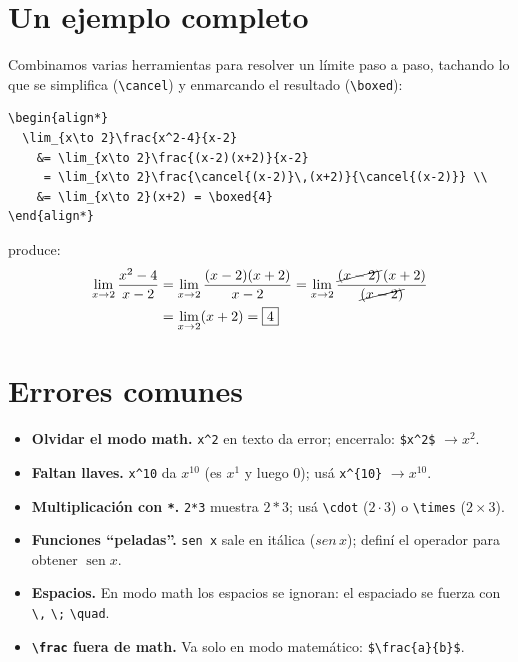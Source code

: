\documentclass[11pt,a4paper]{article}
\newcommand{\C}[1]{\texttt{\textbackslash #1}}   %
\DeclareMathOperator{\sen}{sen}
\theoremstyle{plain}      %
\theoremstyle{definition} %
\theoremstyle{remark}
\begin{document}
\section{Un ejemplo completo}
Combinamos varias herramientas para resolver un límite paso a paso, tachando lo
que se simplifica (\C{cancel}) y enmarcando el resultado (\C{boxed}):
\begin{lstlisting}
\begin{align*}
  \lim_{x\to 2}\frac{x^2-4}{x-2}
    &= \lim_{x\to 2}\frac{(x-2)(x+2)}{x-2}
     = \lim_{x\to 2}\frac{\cancel{(x-2)}\,(x+2)}{\cancel{(x-2)}} \\
    &= \lim_{x\to 2}(x+2) = \boxed{4}
\end{align*}
\end{lstlisting}
produce:
\begin{align*}
  \lim_{x\to 2}\frac{x^2-4}{x-2}
    &= \lim_{x\to 2}\frac{(x-2)(x+2)}{x-2}
     = \lim_{x\to 2}\frac{\cancel{(x-2)}\,(x+2)}{\cancel{(x-2)}} \\
    &= \lim_{x\to 2}(x+2) = \boxed{4}
\end{align*}

\section{Errores comunes}
\begin{itemize}[itemsep=2pt]
  \item \textbf{Olvidar el modo math.} \verb|x^2| en texto da error; encerralo:
    \verb|$x^2$| $\to x^2$.
  \item \textbf{Faltan llaves.} \verb|x^10| da $x^10$ (es $x^1$ y luego $0$);
    usá \verb|x^{10}| $\to x^{10}$.
  \item \textbf{Multiplicación con \texttt{*}.} \verb|2*3| muestra $2*3$; usá
    \verb|\cdot| ($2\cdot3$) o \verb|\times| ($2\times3$).
  \item \textbf{Funciones \enquote{peladas}.} \verb|sen x| sale en itálica
    ($sen\,x$); definí el operador para obtener $\sen x$.
  \item \textbf{Espacios.} En modo math los espacios se ignoran: el espaciado se
    fuerza con \verb|\,| \verb|\;| \verb|\quad|.
  \item \textbf{\C{frac} fuera de math.} Va solo en modo matemático:
    \verb|$\frac{a}{b}$|.
\end{itemize}
\end{document}
